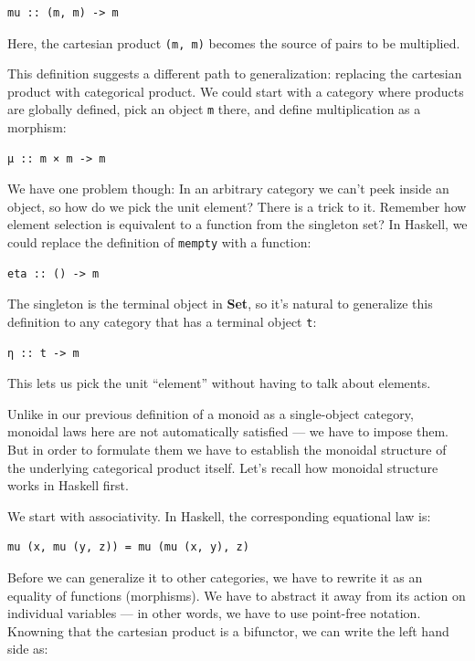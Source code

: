 \begin{verbatim}
mu :: (m, m) -> m
\end{verbatim}

Here, the cartesian product \texttt{(m,\ m)} becomes the source of pairs
to be multiplied.

This definition suggests a different path to generalization: replacing
the cartesian product with categorical product. We could start with a
category where products are globally defined, pick an object \texttt{m}
there, and define multiplication as a morphism:

\begin{verbatim}
μ :: m × m -> m
\end{verbatim}

We have one problem though: In an arbitrary category we can't peek
inside an object, so how do we pick the unit element? There is a trick
to it. Remember how element selection is equivalent to a function from
the singleton set? In Haskell, we could replace the definition of
\texttt{mempty} with a function:

\begin{verbatim}
eta :: () -> m
\end{verbatim}

The singleton is the terminal object in \textbf{Set}, so it's natural to
generalize this definition to any category that has a terminal object
\texttt{t}:

\begin{verbatim}
η :: t -> m
\end{verbatim}

This lets us pick the unit ``element'' without having to talk about
elements.

Unlike in our previous definition of a monoid as a single-object
category, monoidal laws here are not automatically satisfied --- we have
to impose them. But in order to formulate them we have to establish the
monoidal structure of the underlying categorical product itself. Let's
recall how monoidal structure works in Haskell first.

We start with associativity. In Haskell, the corresponding equational
law is:

\begin{verbatim}
mu (x, mu (y, z)) = mu (mu (x, y), z)
\end{verbatim}

Before we can generalize it to other categories, we have to rewrite it
as an equality of functions (morphisms). We have to abstract it away
from its action on individual variables --- in other words, we have to
use point-free notation. Knowning that the cartesian product is a
bifunctor, we can write the left hand side as:

